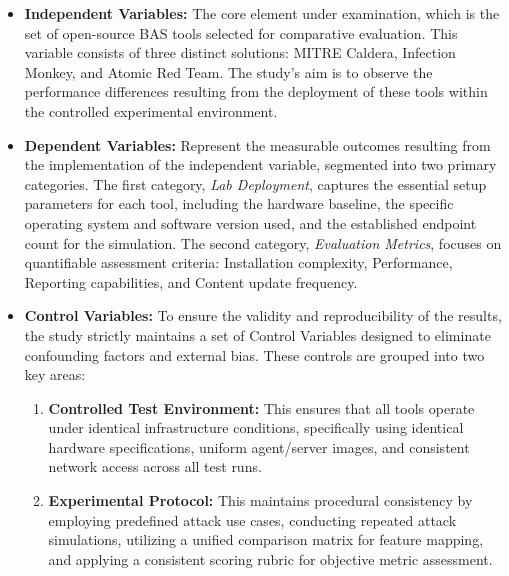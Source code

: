 \begin{itemize}
    \item \textbf{Independent Variables:} The core element under examination, which is the set of open-source BAS tools selected for comparative evaluation. This variable consists of three distinct solutions: MITRE Caldera, Infection Monkey, and Atomic Red Team. The study’s aim is to observe the performance differences resulting from the deployment of these tools within the controlled experimental environment.
    \item \textbf{Dependent Variables:} Represent the measurable outcomes resulting from the implementation of the independent variable, segmented into two primary categories. The first category, \textit{Lab Deployment}, captures the essential setup parameters for each tool, including the hardware baseline, the specific operating system and software version used, and the established endpoint count for the simulation. The second category, \textit{Evaluation Metrics}, focuses on quantifiable assessment criteria: Installation complexity, Performance, Reporting capabilities, and Content update frequency.
    \item \textbf{Control Variables:} To ensure the validity and reproducibility of the results, the study strictly maintains a set of Control Variables designed to eliminate confounding factors and external bias. These controls are grouped into two key areas:
    
    \begin{enumerate}
        \item \textbf{Controlled Test Environment:} This ensures that all tools operate under identical infrastructure conditions, specifically using identical hardware specifications, uniform agent/server images, and consistent network access across all test runs.
        
        \item \textbf{Experimental Protocol:} This maintains procedural consistency by employing predefined attack use cases, conducting repeated attack simulations, utilizing a unified comparison matrix for feature mapping, and applying a consistent scoring rubric for objective metric assessment.
    \end{enumerate}
 \end{itemize}   
 

